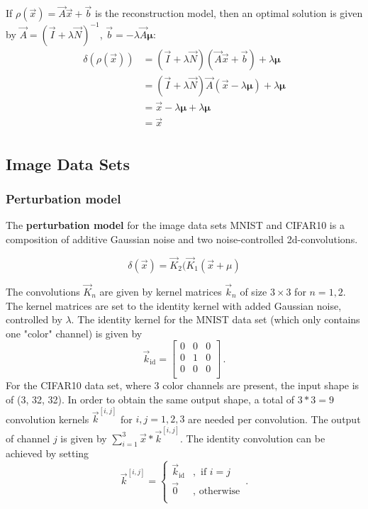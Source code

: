 If $\rho(\vec x) = \vec A \vec x + \vec b$ is the reconstruction model, then an optimal solution is given by
$\vec A = (\vec I + \lambda \vec N)^{-1}$, $\vec b = -\lambda \vec A \boldsymbol \mu$:
\begin{align*}
    \delta ( \rho (\vec x)) &= (\vec I + \lambda \vec N)(\vec A \vec x + \vec b) + \lambda \boldsymbol \mu \\
    &= (\vec I + \lambda \vec N)\vec A (\vec x  - \lambda \boldsymbol \mu) + \lambda \boldsymbol \mu \\
    &= \vec x  -\lambda \boldsymbol \mu + \lambda \boldsymbol \mu \\
    &= \vec x \\
\end{align*}

\subsection{Image Data Sets}

\subsubsection{Perturbation model}

The \textbf{perturbation model} for the image data sets MNIST and CIFAR10
is a composition of additive Gaussian noise and two noise-controlled 2d-convolutions.

\[
    \delta(\vec x) = \vec K_2(\vec K_1(\vec x + \mu)
\]

The convolutions $\vec K_n$ are given by kernel matrices $\vec k_n$ of size $3\times3$ for $n=1,2$.
The kernel matrices are set to the identity kernel with added Gaussian noise, controlled by $\lambda$.
The identity kernel for the MNIST data set (which only contains one "color" channel) is given by 
\begin{equation*}
    \vec k_{\text{id}} = \begin{bmatrix}
        0 & 0 & 0 \\
        0 & 1 & 0 \\
        0 & 0 & 0 \\
    \end{bmatrix} \,.
\end{equation*}
For the CIFAR10 data set, where 3 color channels are present, the input shape is of (3, 32, 32). 
In order to obtain the same output shape, 
a total of $3*3=9$ convolution kernels $\vec k^{[i,j]}$ for $i,j=1,2,3$ are needed per convolution.
The output of channel $j$ is given by $\sum_{i=1}^{3} \vec x * \vec k^{[i, j]}$.
The identity convolution can be achieved by setting 
\[
    \vec k^{[i,j]} = \begin{cases}
        \vec k_{\text{id}} &, \text{ if } i = j\\
        \vec 0 &, \text{ otherwise} \\
    \end{cases} \,.
\]

